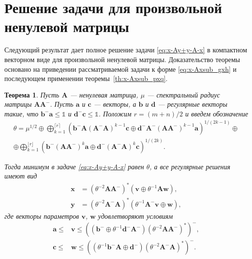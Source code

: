 \documentclass[specialist,
               substylefile = spbu.rtx,
               subf,href,colorlinks=true, 12pt]{disser}
\newtheorem{theorem}{Теорема}
\theoremstyle{definition}
\begin{document}
\section{Решение задачи для произвольной ненулевой матрицы}\label{sec:SCAM}
Следующий результат дает полное решение задачи \eqref{eq:x-Ay+y-A-x} в компактном векторном виде для произвольной ненулевой матрицы. Доказательство теоремы основано на приведении рассматриваемой задачи к форме \eqref{eq:x-Axsub_gxh} и последующем применении теоремы~\ref{th:x-Axsub_pxq}.
\begin{theorem}\label{th:trop_nonzero}
Пусть $\bm{A}$ --- ненулевая матрица, $\mu$ --- спектральный радиус матрицы $\bm{A}\bm{A}^{-}$. Пусть $\bm{a}$ и $\bm{c}$ --- векторы,  а $\bm{b}$ и $\bm{d}$ --- регулярные векторы такие, что $\bm{b}^{-}\bm{a}\leq\mathbb{1}$ и $\bm{d}^{-}\bm{c}\leq\mathbb{1}$.  Положим $r=(m+n)/2$ и введем обозначение
\begin{multline}
\label{eq:theta}
\theta
=
\mu^{1/2}
\oplus
\bigoplus_{k=1}^{\lceil r\rceil}
\left(
\bm{b}^{-}\bm{A}(\bm{A}^{-}\bm{A})^{k-1}\bm{c}
\oplus
\bm{d}^{-}\bm{A}^{-}(\bm{A}\bm{A}^{-})^{k-1}\bm{a}
\right)^{1/(2k-1)}
\oplus
\\
\oplus
\bigoplus_{k=1}^{\lfloor r\rfloor}
\left(
\bm{b}^{-}(\bm{A}\bm{A}^{-})^{k}\bm{a}
\oplus
\bm{d}^{-}(\bm{A}^{-}\bm{A})^{k}\bm{c}
\right)^{1/(2k)}
.
\end{multline}

Тогда минимум в задаче \eqref{eq:x-Ay+y-A-x} равен $\theta$, а все регулярные решения имеют вид
\begin{align*}
\bm{x}
&=
(\theta^{-2}\bm{A}\bm{A}^{-})^{\ast}(\bm{v}\oplus\theta^{-1}\bm{A}\bm{w})
,
\\
\bm{y}
&=
(\theta^{-2}\bm{A}^{-}\bm{A})^{\ast}(\theta^{-1}\bm{A}^{-}\bm{v}\oplus\bm{w})
,
\end{align*}
где векторы параметров $\bm{v}$, $\bm{w}$ удовлетворяют условиям
\begin{equation}\label{eq:vw_constraints}
\begin{aligned}
\bm{a}
\leq
&\bm{v}
\leq
((\bm{b}^{-}\oplus\theta^{-1}\bm{d}^{-}\bm{A}^{-})(\theta^{-2}\bm{A}\bm{A}^{-})^{\ast})^{-}
,
\\
\bm{c}
\leq
&\bm{w}
\leq
((\theta^{-1}\bm{b}^{-}\bm{A}\oplus\bm{d}^{-})(\theta^{-2}\bm{A}^{-}\bm{A})^{\ast})^{-}
.
\end{aligned}
\end{equation}
\end{theorem}
\end{document}
